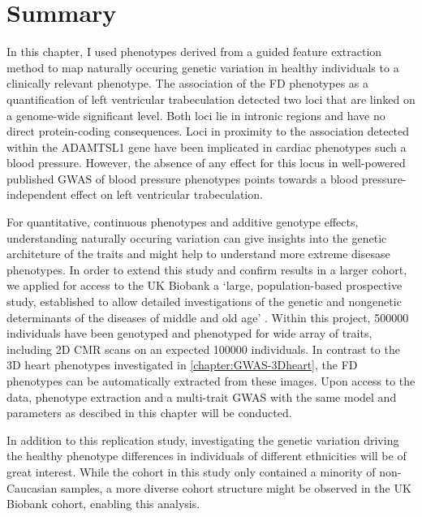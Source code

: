 \section{Summary}
In this chapter, I used phenotypes derived from a guided feature extraction method to map naturally occuring genetic variation in healthy individuals to a clinically relevant phenotype. The association of the FD phenotypes as a quantification of left ventricular trabeculation detected two loci that are linked on a genome-wide significant level. Both loci lie in intronic regions and have no direct protein-coding consequences. Loci in proximity to the association detected within the ADAMTSL1 gene have been implicated in cardiac phenotypes such a blood pressure. However, the absence of any effect for this locus in well-powered published GWAS of blood pressure phenotypes points towards a blood pressure-independent effect on left ventricular trabeculation.

For quantitative, continuous phenotypes and additive genotype effects, understanding naturally occuring variation can give insights into the genetic architeture of the traits and might help to understand more extreme disesase phenotypes. In order to extend this study and confirm results in a larger cohort, we applied for access to the UK Biobank a `large, population-based prospective study, established to allow detailed investigations of the genetic and nongenetic determinants of the diseases of middle and old age' \citep{Sudlow2015}. Within this project, \num{500000} individuals have been genotyped and phenotyped for wide array of traits, including 2D CMR scans on an expected \num{100000} individuals. In contrast to the 3D heart phenotypes investigated in \cref{chapter:GWAS-3Dheart}, the FD phenotypes can be automatically extracted from these images. Upon access to the data,  phenotype extraction and a multi-trait GWAS with the same model and parameters as descibed in this chapter will be conducted. 

In addition to this replication study, investigating the genetic variation driving the healthy phenotype differences in individuals of different ethnicities \citep{Kawel2012,Captur2014} will be of great interest. While the cohort in this study only contained a minority of non-Caucasian samples, a more diverse cohort structure might be observed in the UK Biobank cohort, enabling this analysis. 
